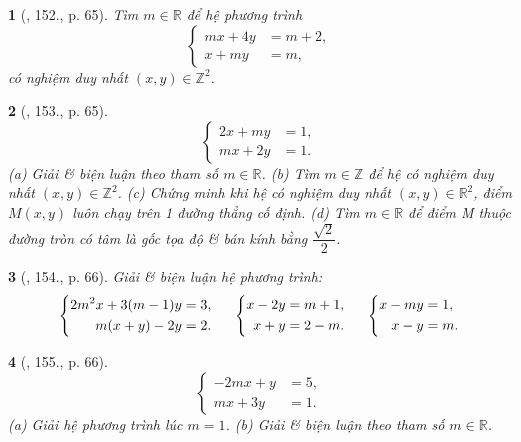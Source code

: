 \documentclass{article}
\newtheorem{baitoan}{}
\begin{document}
\begin{baitoan}[\cite{Dong_23_1001_toan_I}, 152., p. 65]
	Tìm $m\in\mathbb{R}$ để hệ phương trình
	\begin{equation*}
		\left\{\begin{split}
			mx + 4y &= m + 2,\\
			x + my &= m,
		\end{split}\right.
	\end{equation*}
	có nghiệm duy nhất $(x,y)\in\mathbb{Z}^2$.
\end{baitoan}

\begin{baitoan}[\cite{Dong_23_1001_toan_I}, 153., p. 65]
	\begin{equation*}
		\left\{\begin{split}
			2x + my &= 1,\\
			mx + 2y &= 1.
		\end{split}\right.
	\end{equation*}
	(a) Giải \& biện luận theo tham số $m\in\mathbb{R}$. (b) Tìm $m\in\mathbb{Z}$ để hệ có nghiệm duy nhất $(x,y)\in\mathbb{Z}^2$. (c) Chứng minh khi hệ có nghiệm duy nhất $(x,y)\in\mathbb{R}^2$, điểm $M(x,y)$ luôn chạy trên 1 đường thẳng cố định. (d) Tìm $m\in\mathbb{R}$ để điểm M thuộc đường tròn có tâm là gốc tọa độ \& bán kính bằng $\dfrac{\sqrt{2}}{2}$.
\end{baitoan}

\begin{baitoan}[\cite{Dong_23_1001_toan_I}, 154., p. 66]
	Giải \& biện luận hệ phương trình:
	\begin{equation*}
		\left\{\begin{split}
			2m^2x + 3(m - 1)y &= 3,\\
			m(x + y) - 2y &= 2.
		\end{split}\right.\hspace{5mm}\left\{\begin{split}
			x - 2y &= m + 1,\\
			x + y &= 2 - m.
		\end{split}\right.\hspace{5mm}\left\{\begin{split}
			x - my &= 1,\\
			x - y &= m.
		\end{split}\right.		
	\end{equation*}
\end{baitoan}

\begin{baitoan}[\cite{Dong_23_1001_toan_I}, 155., p. 66]
	\begin{equation*}
		\left\{\begin{split}
			-2mx + y &= 5,\\
			mx + 3y &= 1.
		\end{split}\right.
	\end{equation*}
	(a) Giải hệ phương trình lúc $m = 1$. (b) Giải \& biện luận theo tham số $m\in\mathbb{R}$.
\end{baitoan}
\end{document}
